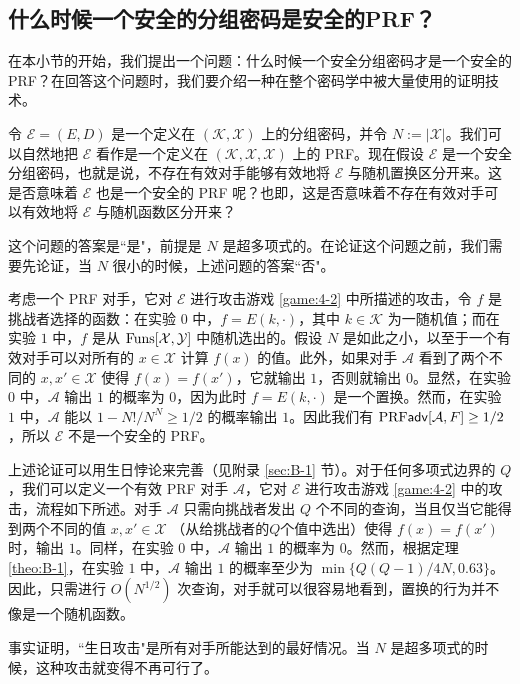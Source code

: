 \subsection{什么时候一个安全的分组密码是安全的PRF？}

在本小节的开始，我们提出一个问题：什么时候一个安全分组密码才是一个安全的 PRF？在回答这个问题时，我们要介绍一种在整个密码学中被大量使用的证明技术。

令 $\mathcal{E}=(E,D)$ 是一个定义在 $(\mathcal{K},\mathcal{X})$ 上的分组密码，并令 $N:=|\mathcal{X}|$。我们可以自然地把 $\mathcal{E}$ 看作是一个定义在 $(\mathcal{K},\mathcal{X},\mathcal{X})$ 上的 PRF。现在假设 $\mathcal{E}$ 是一个安全分组密码，也就是说，不存在有效对手能够有效地将 $\mathcal{E}$ 与随机置换区分开来。这是否意味着 $\mathcal{E}$ 也是一个安全的 PRF 呢？也即，这是否意味着不存在有效对手可以有效地将 $\mathcal{E}$ 与随机函数区分开来？

这个问题的答案是``是"，前提是 $N$ 是超多项式的。在论证这个问题之前，我们需要先论证，当 $N$ 很小的时候，上述问题的答案``否"。

考虑一个 PRF 对手，它对 $\mathcal{E}$ 进行攻击游戏 \ref{game:4-2} 中所描述的攻击，令 $f$ 是挑战者选择的函数：在实验 $0$ 中，$f=E(k,\cdot)$，其中 $k\in\mathcal{K}$ 为一随机值；而在实验 $1$ 中，$f$ 是从 ${\rm Funs}[\mathcal{X},\mathcal{Y}]$ 中随机选出的。假设 $N$ 是如此之小，以至于一个有效对手可以对所有的 $x\in\mathcal{X}$ 计算 $f(x)$ 的值。此外，如果对手 $\mathcal{A}$ 看到了两个不同的 $x,x'\in\mathcal{X}$ 使得 $f(x)=f(x')$，它就输出 $1$，否则就输出 $0$。显然，在实验 $0$ 中，$\mathcal{A}$ 输出 $1$ 的概率为 $0$，因为此时 $f=E(k,\cdot)$ 是一个置换。然而，在实验 $1$ 中，$\mathcal{A}$ 能以 $1-{N!}/{N^N}\geq{1}/{2}$ 的概率输出 $1$。因此我们有 ${\rm PRF\mathsf{adv}}[\mathcal{A}, F]\geq{1/2}$，所以 $\mathcal{E}$ 不是一个安全的 PRF。

上述论证可以用生日悖论来完善（见附录 \ref{sec:B-1} 节）。对于任何多项式边界的 $Q$，我们可以定义一个有效 PRF 对手 $\mathcal{A}$，它对 $\mathcal{E}$ 进行攻击游戏 \ref{game:4-2} 中的攻击，流程如下所述。对手 $\mathcal{A}$ 只需向挑战者发出 $Q$ 个不同的查询，当且仅当它能得到两个不同的值 $x,x'\in\mathcal{X}$ （从给挑战者的$Q$个值中选出）使得 $f(x)=f(x')$时，输出 $1$。同样，在实验 $0$ 中，$\mathcal{A}$ 输出 $1$ 的概率为 $0$。然而，根据定理 \ref{theo:B-1}，在实验 $1$ 中，$\mathcal{A}$ 输出 $1$ 的概率至少为 $\min\{{Q(Q-1)}/{4N},0.63\}$。因此，只需进行 $O(N^{1/2})$ 次查询，对手就可以很容易地看到，置换的行为并不像是一个随机函数。

事实证明，``生日攻击"是所有对手所能达到的最好情况。当 $N$ 是超多项式的时候，这种攻击就变得不再可行了。

